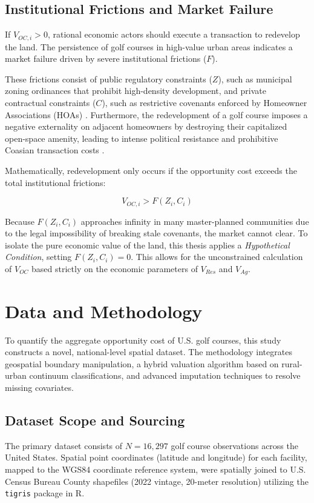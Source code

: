 \documentclass[10pt, letterpaper]{article}
\begin{document}
\subsection{Institutional Frictions and Market Failure}
If $V_{OC, i} > 0$, rational economic actors should execute a transaction to redevelop the land. The persistence of golf courses in high-value urban areas indicates a market failure driven by severe institutional frictions ($F$). 

These frictions consist of public regulatory constraints ($Z$), such as municipal zoning ordinances that prohibit high-density development, and private contractual constraints ($C$), such as restrictive covenants enforced by Homeowner Associations (HOAs) \parencite{Ellickson2022, Korngold2024}. Furthermore, the redevelopment of a golf course imposes a negative externality on adjacent homeowners by destroying their capitalized open-space amenity, leading to intense political resistance and prohibitive Coasian transaction costs \parencite{Coase1960}.

Mathematically, redevelopment only occurs if the opportunity cost exceeds the total institutional frictions:

\begin{equation}
    V_{OC, i} > F(Z_i, C_i)
\end{equation}

Because $F(Z_i, C_i)$ approaches infinity in many master-planned communities due to the legal impossibility of breaking stale covenants, the market cannot clear. To isolate the pure economic value of the land, this thesis applies a \textit{Hypothetical Condition}, setting $F(Z_i, C_i) = 0$. This allows for the unconstrained calculation of $V_{OC}$ based strictly on the economic parameters of $V_{Res}$ and $V_{Ag}$.

\newpage

\section{Data and Methodology}

To quantify the aggregate opportunity cost of U.S. golf courses, this study constructs a novel, national-level spatial dataset. The methodology integrates geospatial boundary manipulation, a hybrid valuation algorithm based on rural-urban continuum classifications, and advanced imputation techniques to resolve missing covariates.

\subsection{Dataset Scope and Sourcing}
The primary dataset consists of $N = 16,297$ golf course observations across the United States. Spatial point coordinates (latitude and longitude) for each facility, mapped to the WGS84 coordinate reference system, were spatially joined to U.S. Census Bureau County shapefiles (2022 vintage, 20-meter resolution) utilizing the \texttt{tigris} package in R. 
\end{document}
